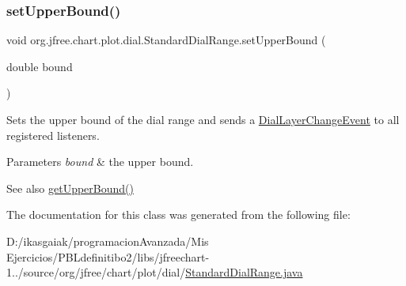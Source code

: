 \subsubsection{\texorpdfstring{set\+Upper\+Bound()}{setUpperBound()}}
{\footnotesize\ttfamily void org.\+jfree.\+chart.\+plot.\+dial.\+Standard\+Dial\+Range.\+set\+Upper\+Bound (\begin{DoxyParamCaption}\item[{double}]{bound }\end{DoxyParamCaption})}

Sets the upper bound of the dial range and sends a \mbox{\hyperlink{classorg_1_1jfree_1_1chart_1_1plot_1_1dial_1_1_dial_layer_change_event}{Dial\+Layer\+Change\+Event}} to all registered listeners.


\begin{DoxyParams}{Parameters}
{\em bound} & the upper bound.\\
\hline
\end{DoxyParams}
\begin{DoxySeeAlso}{See also}
\mbox{\hyperlink{classorg_1_1jfree_1_1chart_1_1plot_1_1dial_1_1_standard_dial_range_a2bd7326ba0d20c64028fd552e90cc27c}{get\+Upper\+Bound()}} 
\end{DoxySeeAlso}


The documentation for this class was generated from the following file\+:\begin{DoxyCompactItemize}
\item 
D\+:/ikasgaiak/programacion\+Avanzada/\+Mis Ejercicios/\+P\+B\+Ldefinitibo2/libs/jfreechart-\/1../source/org/jfree/chart/plot/dial/\mbox{\hyperlink{_standard_dial_range_8java}{Standard\+Dial\+Range.\+java}}\end{DoxyCompactItemize}
